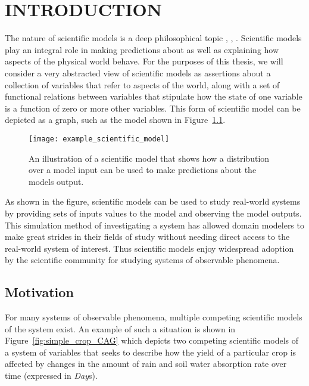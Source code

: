 \chapter{INTRODUCTION\label{chapter:introduction}}
The nature of scientific models is a deep philosophical topic \citep{giere2010explaining}, \citep{morrison2009models}, \citep{frigg2006models}.
Scientific models play an integral role in making predictions about as well as explaining how aspects of the physical world behave.
For the purposes of this thesis, we will consider a very abstracted view of scientific models as assertions about a collection of variables that refer to aspects of the world, along with a set of functional relations between variables that stipulate how the state of one variable is a function of zero or more other variables.
This form of scientific model can be depicted as a graph, such as the model shown in Figure~\ref{fig:example_sci_model}.

\begin{figure}[!htbp]
  \label{fig:example_sci_model}
  \centering
  \texttt{[image: example\_scientific\_model]}
  \caption[An Example of a Scientific Model]{An illustration of a scientific model that shows how a distribution over a model input can be used to make predictions about the models output.}
\end{figure}

As shown in the figure, scientific models can be used to study real-world systems by providing sets of inputs values to the model and observing the model outputs.
This simulation method of investigating a system has allowed domain modelers to make great strides in their fields of study without needing direct access to the real-world system of interest.
Thus scientific models enjoy widespread adoption by the scientific community for studying systems of observable phenomena.

\section{Motivation\label{sec:motivation}}
For many systems of observable phenomena, multiple competing scientific models of the system exist.
An example of such a situation is shown in Figure~\ref{fig:simple_crop_CAG} which depicts two competing scientific models of a system of variables that seeks to describe how the yield of a particular crop is affected by changes in the amount of rain and soil water absorption rate over time (expressed in \emph{Day}s).

